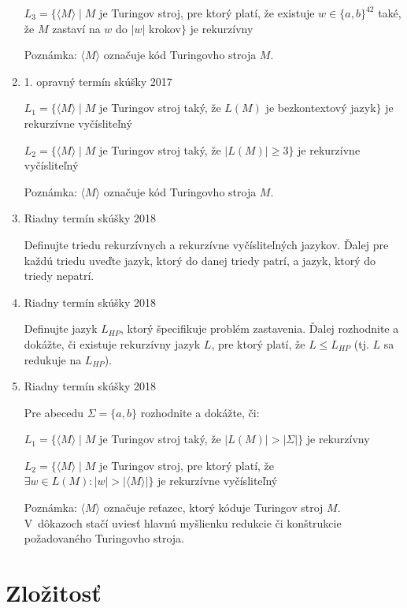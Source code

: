 \documentclass[]{article}
\begin{document}
\begin{enumerate}
		$L_3 = \{\langle M \rangle \mid M$ je Turingov stroj, pre ktorý platí, že existuje $w \in \{a,b\}^{42}$ také, že $M$ zastaví na $w$ do $\vert w \vert$ krokov$\}$ je rekurzívny
		
		Poznámka: $\langle M \rangle$ označuje kód Turingovho stroja $M$.
		
		\item 1. opravný termín skúšky 2017
		
		$L_1 = \{\langle M \rangle \mid M$ je Turingov stroj taký, že $L(M)$ je bezkontextový jazyk$\}$ je rekurzívne vyčísliteľný
		
		$L_2 = \{\langle M \rangle \mid M$ je Turingov stroj taký, že $\vert L(M) \vert \geq 3\}$ je rekurzívne vyčísliteľný
		
		Poznámka: $\langle M \rangle$ označuje kód Turingovho stroja $M$.
		
		\item Riadny termín skúšky 2018
		
		Definujte triedu rekurzívnych a rekurzívne vyčísliteľných jazykov. Ďalej pre každú triedu uveďte jazyk, ktorý do danej triedy patrí, a jazyk, ktorý do triedy nepatrí.
		
		\item Riadny termín skúšky 2018
		
		Definujte jazyk $L_{HP}$, ktorý špecifikuje problém zastavenia. Ďalej rozhodnite a dokážte, či existuje rekurzívny jazyk $L$, pre ktorý platí, že $L \leq L_{HP}$ (tj. $L$ sa redukuje na $L_{HP}$).
		
		\item Riadny termín skúšky 2018
		
		Pre abecedu $\Sigma = \{a, b\}$ rozhodnite a dokážte, či:
		
		$L_1 = \{\langle M \rangle \mid M$ je Turingov stroj taký, že $\vert L(M) \vert  > \vert \Sigma \vert\}$ je rekurzívny
		
		$L_2 = \{\langle M \rangle \mid M$ je Turingov stroj, pre ktorý platí, že $\exists w \in L(M) : \vert w \vert > \vert \langle M \rangle \vert\}$ je rekurzívne vyčísliteľný
		
		Poznámka: $\langle M \rangle$ označuje reťazec, ktorý kóduje Turingov stroj $M$. V~dôkazoch stačí uviesť hlavnú myšlienku redukcie či konštrukcie požadovaného Turingovho stroja.
	\end{enumerate}
	
	\section{Zložitosť}
	
\end{document}
